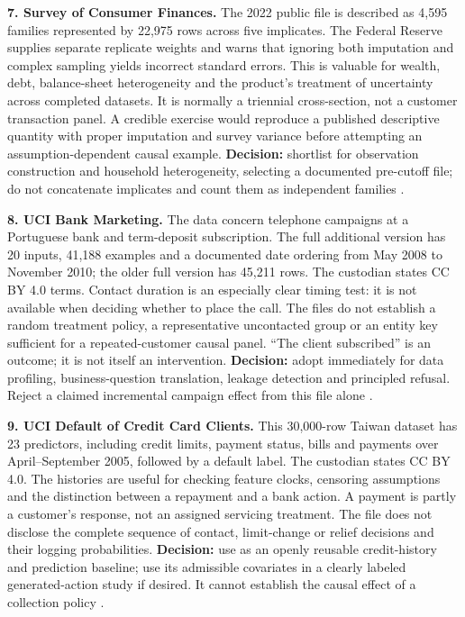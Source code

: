 \textbf{7. Survey of Consumer Finances.} The 2022 public file is
described as 4,595 families represented by 22,975 rows across five
implicates. The Federal Reserve supplies separate replicate weights and
warns that ignoring both imputation and complex sampling yields
incorrect standard errors. This is valuable for wealth, debt,
balance-sheet heterogeneity and the product's treatment of uncertainty
across completed datasets. It is normally a triennial cross-section, not
a customer transaction panel. A credible exercise would reproduce a
published descriptive quantity with proper imputation and survey
variance before attempting an assumption-dependent causal example.
\textbf{Decision:} shortlist for observation construction and household
heterogeneity, selecting a documented pre-cutoff file; do not
concatenate implicates and count them as independent families
\citep{pd15_scf}.

\textbf{8. UCI Bank Marketing.} The data concern telephone campaigns at
a Portuguese bank and term-deposit subscription. The full additional
version has 20 inputs, 41,188 examples and a documented date ordering
from May 2008 to November 2010; the older full version has 45,211 rows.
The custodian states CC BY 4.0 terms. Contact duration is an especially
clear timing test: it is not available when deciding whether to place
the call. The files do not establish a random treatment policy, a
representative uncontacted group or an entity key sufficient for a
repeated-customer causal panel. ``The client subscribed'' is an outcome;
it is not itself an intervention. \textbf{Decision:} adopt immediately
for data profiling, business-question translation, leakage detection and
principled refusal. Reject a claimed incremental campaign effect from
this file alone \citep{pd15_uci_bank,pd15_profile}.

\textbf{9. UCI Default of Credit Card Clients.} This 30,000-row Taiwan
dataset has 23 predictors, including credit limits, payment status,
bills and payments over April--September 2005, followed by a default
label. The custodian states CC BY 4.0. The histories are useful for
checking feature clocks, censoring assumptions and the distinction
between a repayment and a bank action. A payment is partly a customer's
response, not an assigned servicing treatment. The file does not
disclose the complete sequence of contact, limit-change or relief
decisions and their logging probabilities. \textbf{Decision:} use as an
openly reusable credit-history and prediction baseline; use its
admissible covariates in a clearly labeled generated-action study if
desired. It cannot establish the causal effect of a collection policy
\citep{pd15_uci_credit}.

